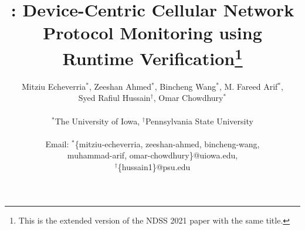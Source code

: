 \documentclass[11pt]{article}
\begin{document}
%

\title{\systemtitle: Device-Centric Cellular Network Protocol Monitoring using Runtime Verification\footnote{
This is the extended version of the NDSS 2021 paper with the same title.
}}

\author{Mitziu Echeverria$^*$, Zeeshan Ahmed$^*$, Bincheng Wang$^*$, M. Fareed Arif$^*$, \\Syed Rafiul Hussain$^\dagger$, Omar Chowdhury$^*$\\ \\
$^*$The University of Iowa, $^\dagger$Pennsylvania State University\\ \\
Email: $^*$\{mitziu-echeverria, zeeshan-ahmed, bincheng-wang,\\ muhammad-arif, omar-chowdhury\}@uiowa.edu,\\$^\dagger$\{hussain1\}@psu.edu}

\date{}




\end{document}

